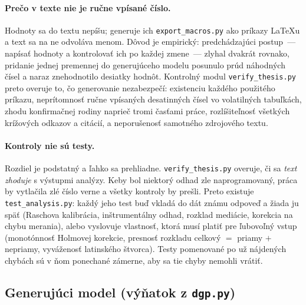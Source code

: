 \paragraph{Prečo v texte nie je ručne vpísané číslo.} Hodnoty sa do textu nepíšu; generuje ich \texttt{export\_macros.py} ako príkazy \LaTeX{}u a text sa na ne odvoláva menom. Dôvod je empirický: predchádzajúci postup~--- napísať hodnoty a kontrolovať ich po každej zmene~--- zlyhal dvakrát rovnako, pridanie jednej premennej do generujúceho modelu posunulo prúd náhodných čísel a naraz znehodnotilo desiatky hodnôt. Kontrolný modul \texttt{verify\_thesis.py} preto overuje to, čo generovanie nezabezpečí: existenciu každého použitého príkazu, neprítomnosť ručne vpísaných desatinných čísel vo volatilných tabuľkách, zhodu konfirmačnej rodiny naprieč tromi časťami práce, rozlíšiteľnosť všetkých krížových odkazov a citácií, a neporušenosť samotného zdrojového textu.

\paragraph{Kontroly nie sú testy.} Rozdiel je podstatný a ľahko sa prehliadne. \texttt{verify\_thesis.py} overuje, či sa \emph{text zhoduje} s výstupmi analýzy. Keby bol niektorý odhad zle naprogramovaný, práca by vytlačila zlé číslo verne a všetky kontroly by prešli. Preto existuje \texttt{test\_analysis.py}: každý jeho test buď vkladá do dát známu odpoveď a žiada ju späť (Raschova kalibrácia, inštrumentálny odhad, rozklad mediácie, korekcia na chybu merania), alebo vyslovuje vlastnosť, ktorá musí platiť pre ľubovoľný vstup (monotónnosť Holmovej korekcie, presnosť rozkladu celkový $=$ priamy $+$ nepriamy, vyváženosť latinského štvorca). Testy pomenované po už nájdených chybách sú v ňom ponechané zámerne, aby sa tie chyby nemohli vrátiť.

\subsection{Generujúci model (výňatok z \texttt{dgp.py})}

